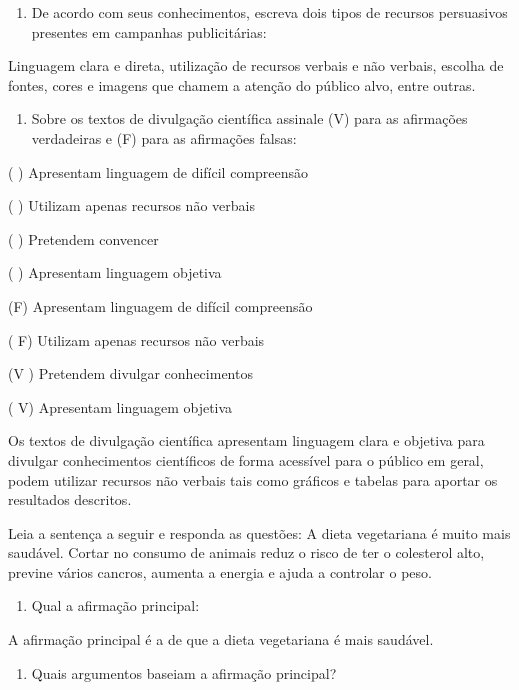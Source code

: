 {

\begin{enumerate}
\def\labelenumi{\arabic{enumi})}
\tightlist
\item
  De acordo com seus conhecimentos, escreva dois tipos de recursos
  persuasivos presentes em campanhas publicitárias:
\end{enumerate}

Linguagem clara e direta, utilização de recursos verbais e não verbais,
escolha de fontes, cores e imagens que chamem a atenção do público alvo,
entre outras.

\begin{enumerate}
\def\labelenumi{\arabic{enumi}.}
\tightlist
\item
  Sobre os textos de divulgação científica assinale (V) para as
  afirmações verdadeiras e (F) para as afirmações falsas:
\end{enumerate}

( ) Apresentam linguagem de difícil compreensão

( ) Utilizam apenas recursos não verbais

( ) Pretendem convencer

( ) Apresentam linguagem objetiva

(F) Apresentam linguagem de difícil compreensão

( F) Utilizam apenas recursos não verbais

(V ) Pretendem divulgar conhecimentos

( V) Apresentam linguagem objetiva

Os textos de divulgação científica apresentam linguagem clara e objetiva
para divulgar conhecimentos científicos de forma acessível para o
público em geral, podem utilizar recursos não verbais tais como gráficos
e tabelas para aportar os resultados descritos.

Leia a sentença a seguir e responda as questões: A dieta vegetariana é
muito mais saudável. Cortar no consumo de animais reduz o risco de ter o
colesterol alto, previne vários cancros, aumenta a energia e ajuda a
controlar o peso.

\begin{enumerate}
\def\labelenumi{\arabic{enumi}.}
\tightlist
\item
  Qual a afirmação principal:
\end{enumerate}

A afirmação principal é a de que a dieta vegetariana é mais saudável.

\begin{enumerate}
\def\labelenumi{\arabic{enumi}.}
\tightlist
\item
  Quais argumentos baseiam a afirmação principal?
\end{enumerate}

}
